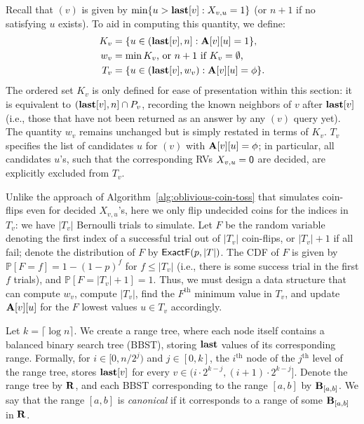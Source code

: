 Recall that $(v)$ is given by $\min\{u > \mathbf{last}[v]: X_{v,u} = 1\}$ (or $n+1$ if no satisfying $u$ exists). To aid in computing this quantity, we define:
\begin{align*}
K_v &= \{u \in (\mathbf{last}[v], n]: \mathbf{A}[v][u]=1\},\\
w_v &= \min K_v \textrm{, or $n+1$ if $K_v = \emptyset$,} \\
T_v &= \{u \in (\mathbf{last}[v], w_v): \mathbf{A}[v][u] = \phi\}.
\end{align*}
The ordered set $K_v$ is only defined for ease of presentation within this section: it is equivalent to $(\mathbf{last}[v],n] \cap P_v$, recording the known neighbors of $v$ after $\mathbf{last}[v]$ (i.e., those that have not been returned as an answer by any $(v)$ query yet). The quantity $w_v$ remains unchanged but is simply restated in terms of $K_v$. $T_v$ specifies the list of candidates $u$ for $(v)$ with $\mathbf{A}[v][u] = \phi$; in particular, all candidates $u$'s, such that the corresponding RVs $X_{v,u} = \mathsf{0}$ are decided, are explicitly excluded from $T_v$.

Unlike the approach of Algorithm~\ref{alg:oblivious-coin-toss} that simulates coin-flips even for decided $X_{v,u}$'s, here we only flip undecided coins for the indices in $T_v$: we have $|T_v|$ Bernoulli trials to simulate. Let $F$ be the random variable denoting the first index of a successful trial out of $|T_v|$ coin-flips, or $|T_v|+1$ if all fail; denote the distribution of $F$ by $\mathsf{ExactF}(p,|T|)$. The CDF of $F$ is given by $\mathbb P[F = f] = 1-(1-p)^f$ for $f \leq |T_v|$ (i.e., there is some success trial in the first $f$ trials), and $\mathbb P[F = |T_v|+1] = 1$. Thus, we must design a data structure that can compute $w_v$, compute $|T_v|$, find the $F^\textrm{th}$ minimum value in $T_v$, and update $\mathbf{A}[v][u]$ for the $F$ lowest values $u \in T_v$ accordingly.

Let $k = \lceil \log n \rceil$. We create a range tree, where each node itself contains a balanced binary search tree (BBST), storing $\mathbf{last}$ values of its corresponding range. Formally, for $i \in [0, n/2^j)$ and $j \in [0, k]$, the $i^\textrm{th}$ node of the $j^\textrm{th}$ level of the range tree, stores $\mathbf{last}[v]$ for every $v \in (i \cdot 2^{k-j}, (i+1)\cdot 2^{k-j}]$. Denote the range tree by $\mathbf{R}$, and each BBST corresponding to the range $[a, b]$ by $\mathbf{B}_{[a,b]}$. We say that the range $[a,b]$  is \emph{canonical} if it corresponds to a range of some $\mathbf{B}_{[a,b]}$ in $\mathbf{R}$.

